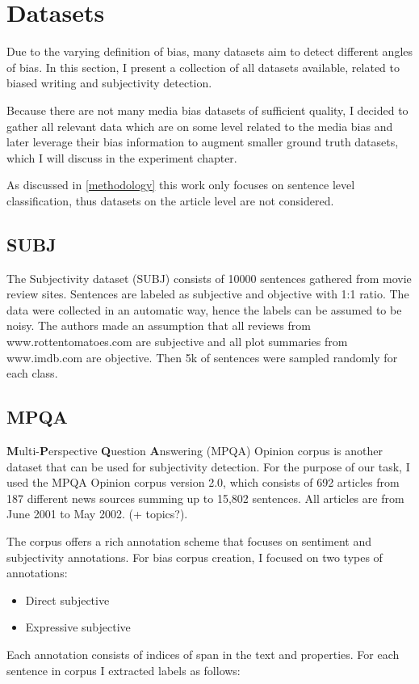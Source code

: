 \section{Datasets}
Due to the varying definition of bias, many datasets aim to detect different angles of bias. In this section, I present a collection of all datasets available, related to biased writing and subjectivity detection.

Because there are not many media bias datasets of sufficient quality, I decided to gather all relevant data which are on some level related to the media bias and later leverage their bias information to augment smaller ground truth datasets, which I will discuss in the experiment chapter.

As discussed in \ref{methodology} this work only focuses on sentence level classification, thus datasets on the article level are not considered.
\subsection{SUBJ}
The Subjectivity dataset (SUBJ) \cite{Pang+Lee:04a} consists of 10000 sentences gathered from movie review sites. Sentences are labeled as subjective and objective with 1:1 ratio. The data were collected in an automatic way, hence the labels can be assumed to be noisy. The authors made an assumption that all reviews from www.rottentomatoes.com are subjective and all plot summaries from www.imdb.com are objective. Then 5k of sentences were sampled randomly for each class.

\subsection{MPQA}
\textbf{M}ulti-\textbf{P}erspective \textbf{Q}uestion \textbf{A}nswering (MPQA) Opinion corpus is another dataset that can be used for subjectivity detection. For the purpose of our task, I used the MPQA Opinion corpus version 2.0, which consists of 692 articles from 187 different news sources summing up to 15,802 sentences. All articles are from June 2001 to May 2002. (+ topics?).

The corpus offers a rich annotation scheme \cite{wiebe2005annotating} that focuses on sentiment and subjectivity annotations. For bias corpus creation, I focused on two types of annotations:
\begin{itemize}
    \item Direct subjective
    \item Expressive subjective
\end{itemize}
Each annotation consists of indices of span in the text and properties. For each sentence in corpus I extracted labels as follows:

